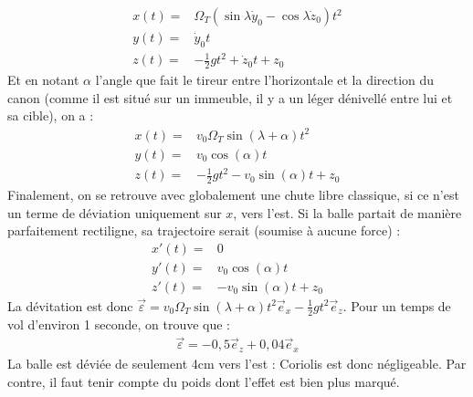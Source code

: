 \documentclass{report}
\begin{document}
\begin{itemize}
\begin{align*}
        x(t)=& \Omega_T(\sin\lambda\dot{y}_0-\cos\lambda\dot{z}_0)t^2\\ 
        y(t)=&\dot{y}_0t \\
        z(t)=&-\frac{1}{2} gt^2 + \dot{z}_0t+z_0
	\end{align*}	
Et en notant $\alpha$ l'angle que fait le tireur entre l'horizontale et la direction du canon (comme il est situé sur un immeuble, il y a un léger dénivellé entre lui et sa cible), on a :
	\begin{align*}
        x(t)=& v_0\Omega_T\sin(\lambda+\alpha)t^2\\ 
        y(t)=&v_0\cos(\alpha)t \\
        z(t)=&-\frac{1}{2} gt^2 -v_0\sin(\alpha)t+z_0
	\end{align*}	
Finalement, on se retrouve avec globalement une chute libre classique, si ce n'est un terme de déviation uniquement sur $x$, vers l'est. Si la balle partait de manière parfaitement rectiligne, sa trajectoire serait (soumise à aucune force) :
	\begin{align*}
        x'(t)=& 0\\ 
        y'(t)=&v_0\cos(\alpha)t \\
        z'(t)=& -v_0\sin(\alpha)t+z_0
	\end{align*}	
La dévitation est donc $\vec{\varepsilon	}=v_0\Omega_T\sin(\lambda+\alpha)t^2\vec{e}_x-\frac{1}{2} gt^2\vec{e}_z$. Pour un temps de vol d'environ 1 seconde, on trouve que :
\begin{align*}
	\vec{\varepsilon}=-0,5\vec{e}_z+0,04\vec{e}_x
\end{align*}
La balle est déviée de seulement 4cm vers l'est : Coriolis est donc négligeable. Par contre, il faut tenir compte du poids dont l'effet est bien plus marqué. 
	
\end{itemize}
\end{document}
